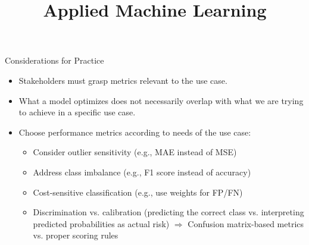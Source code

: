 \documentclass[11pt,compress,t,notes=noshow, aspectratio=169, xcolor=table]{beamer}
\title{Applied Machine Learning}
\date{}
\begin{document}
\newcommand{\titlefigure}{figure/dtrain_dtest_resampling}
\newcommand{\learninggoals}{
\item What is the difference between a loss function and a performance metric?
\item What are desirable properties of a performance metric?
\item What are guiding questions to select a performance metric?}



\begin{frame}{Considerations for Practice}

\begin{itemize}
    \item Stakeholders must grasp metrics relevant to the use case.
    \item What a model optimizes does not necessarily overlap with what we are trying to achieve in a specific use case.
    \item Choose performance metrics according to needs of the use case:
    \begin{itemize}
        \item Consider outlier sensitivity (e.g., MAE instead of MSE)
        \item Address class imbalance (e.g., F1 score instead of accuracy)
        \item Cost-sensitive classification (e.g., use weights for FP/FN)
        \item Discrimination vs. calibration (predicting the correct class vs. interpreting predicted probabilities as actual risk) \newline
        $\Rightarrow$ Confusion matrix-based metrics vs. proper scoring rules
    \end{itemize}

\end{itemize}
\end{frame}
\end{document}
